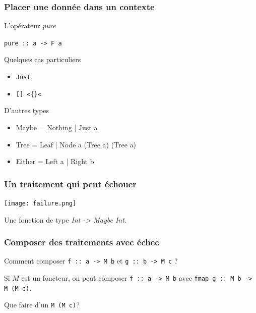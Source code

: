 \documentclass{beamer}
\begin{document}
\begin{frame}
\frametitle{Placer une donnée dans un contexte}

\begin{block}{L'opérateur \emph{pure}}
\begin{center}
\verb!pure :: a -> F a!
\end{center}
\end{block}

\begin{exampleblock}{Quelques cas particuliers}
	\begin{itemize}
		\item \verb!Just!
		\item \verb![] <{}<!
	\end{itemize}
\end{exampleblock}
\begin{block}{D'autres types}
	\begin{itemize}
		\item Maybe =  Nothing | Just a
		\item Tree = Leaf | Node a (Tree a) (Tree a)
		\item Either = Left a | Right b
	\end{itemize}
\end{block}
\end{frame}


\begin{frame}
\frametitle{Un traitement qui peut échouer}

\begin{center}
\texttt{[image: failure.png]}
\end{center}
\begin{exampleblock}{}
Une fonction de type \emph{Int -> Maybe Int}.
\end{exampleblock}
\end{frame}

\begin{frame}
\frametitle{Composer des traitements avec échec}
\begin{block}{}
Comment composer \verb!f :: a -> M b! et \verb!g :: b -> M c! ?
\end{block}
\pause
\begin{block}{}
Si $M$ est un foncteur, on peut composer
\verb!f :: a -> M b! avec \verb!fmap g :: M b -> M (M c)!.
\end{block}
\pause
\begin{block}{}
Que faire d'un \verb!M (M c)!?
\end{block}

\end{frame}
\end{document}
